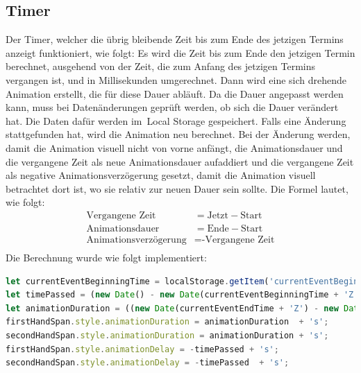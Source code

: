 \subsection{Timer}\label{subsec:timer}
Der Timer, welcher die übrig bleibende Zeit bis zum Ende des jetzigen Termins anzeigt funktioniert, wie folgt:
\newline
\newline
Es wird die Zeit bis zum Ende den jetzigen Termin berechnet, ausgehend von der Zeit, die zum Anfang des jetzigen Termins vergangen ist, und in Millisekunden umgerechnet.
Dann wird eine sich drehende Animation erstellt, die für diese Dauer abläuft.
\newline
Da die Dauer angepasst werden kann, muss bei Datenänderungen geprüft werden, ob sich die Dauer verändert hat.
Die Daten dafür werden im~\gls{Local Storage} gespeichert.
Falls eine Änderung stattgefunden hat, wird die Animation neu berechnet.
Bei der Änderung werden, damit die Animation visuell nicht von vorne anfängt, die Animationsdauer und die vergangene Zeit als neue Animationsdauer aufaddiert und die vergangene Zeit als negative Animationsverzögerung gesetzt, damit die Animation visuell betrachtet dort ist, wo sie relativ zur neuen Dauer sein sollte.
\newline
\newline
Die Formel lautet, wie folgt:
\newline
\newline
\begin{equation}
\begin{aligned}
    \text{Vergangene Zeit} &= \text{Jetzt} - \text{Start} \\
\text{Animationsdauer} &= \text{Ende} - \text{Start} \\
    \text {Animationsverzögerung} &= \text{-Vergangene Zeit} \\
\end{aligned}\label{eq:equation}
\end{equation}
\newline
\newline
Die Berechnung wurde wie folgt implementiert:
\newline
\newline
\begin{lstlisting}[language=JavaScript,label={lst:JavaScript Timer}]
let currentEventBeginningTime = localStorage.getItem('currentEventBeginningTime');
let timePassed = (new Date() - new Date(currentEventBeginningTime + 'Z')) / 1000;
let animationDuration = ((new Date(currentEventEndTime + 'Z') - new Date(currentEventBeginningTime + 'Z')) / 1000);
firstHandSpan.style.animationDuration = animationDuration  + 's';
secondHandSpan.style.animationDuration = animationDuration + 's';
firstHandSpan.style.animationDelay = -timePassed + 's';
secondHandSpan.style.animationDelay = -timePassed  + 's';
\end{lstlisting}
